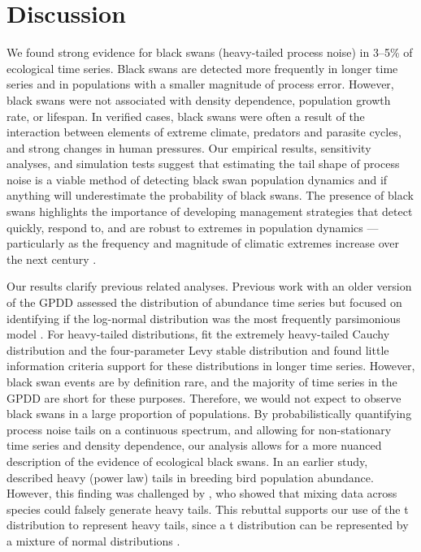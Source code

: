 \section{Discussion}

We found strong evidence for black swans (heavy-tailed process noise) in 3--5\% of ecological time series. Black swans are detected more frequently in longer time series and in populations with a smaller magnitude of process error. However, black swans were not associated with density dependence, population growth rate, or lifespan. In verified cases, black swans were often a result of the interaction between elements of extreme climate, predators and parasite cycles, and strong changes in human pressures. Our empirical results, sensitivity analyses, and simulation tests suggest that estimating the tail shape of process noise is a viable method of detecting black swan population dynamics and if anything will underestimate the probability of black swans. The presence of black swans highlights the importance of developing management strategies that detect quickly, respond to, and are robust to extremes in population dynamics --- particularly as the frequency and magnitude of climatic extremes increase over the next century \citep{easterling2000,ipcc2012}.

Our results clarify previous related analyses. Previous work with an older version of the GPDD assessed the distribution of abundance time series but focused on identifying if the log-normal distribution was the most frequently parsimonious model \citep{halley2002}. For heavy-tailed distributions, \citet{halley2002} fit the extremely heavy-tailed Cauchy distribution and the four-parameter Levy stable distribution and found little information criteria support for these distributions in longer time series. However, black swan events are by definition rare, and the majority of time series in the GPDD are short for these purposes. Therefore, we would not expect to observe black swans in a large proportion of populations. By probabilistically quantifying process noise tails on a continuous spectrum, and allowing for non-stationary time series and density dependence, our analysis allows for a more nuanced description of the evidence of ecological black swans. In an earlier study, \citet{keitt1998} described heavy (power law) tails in breeding bird population abundance. However, this finding was challenged by \citet{allen2001}, who showed that mixing data across species could falsely generate heavy tails. This rebuttal supports our use of the t distribution to represent heavy tails, since a t distribution can be represented by a mixture of normal distributions \citep[with the same mean and inverse-gamma-distributed variances,][]{gelman2014}.

